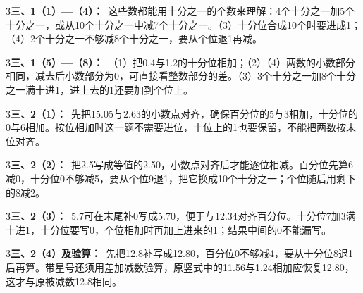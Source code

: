 \documentclass[multi=snippet,border={5bp 20bp 5bp 5bp}]{standalone}
\newenvironment{snippet}[3]{\begin{minipage}{#1bp}\color{answerred}\fontsize{#2}{#3}\selectfont\raggedright}{\end{minipage}}
\begin{document}
\begin{snippet}{505}{11.5}{14}\begin{multicols}{3}\raggedcolumns \textbf{三、1（1）—（4）：}\ 这些数都能用十分之一的个数来理解：4个十分之一加5个十分之一，或从10个十分之一中减7个十分之一。（3）十分位合成10个时要进成1；（4）2个十分之一不够减8个十分之一，要从个位退1再减。\end{multicols}\end{snippet}
\begin{snippet}{505}{11.5}{14}\begin{multicols}{3}\raggedcolumns \textbf{三、1（5）—（8）：}\ （1）把0.4与1.2的十分位相加；（2）（4）两数的小数部分相同，减去后小数部分为0，可直接看整数部分的差。（3）3个十分之一加8个十分之一满十进1，进上去的1还要加到个位上。\end{multicols}\end{snippet}
\begin{snippet}{505}{11.5}{14}\begin{multicols}{3}\raggedcolumns \textbf{三、2（1）：}\ 先把15.05与2.63的小数点对齐，确保百分位的5与3相加，十分位的0与6相加。按位相加时这一题不需要进位，十位上的1也要保留，不能把两数按末位对齐。\end{multicols}\end{snippet}
\begin{snippet}{505}{11.5}{14}\begin{multicols}{3}\raggedcolumns \textbf{三、2（2）：}\ 把2.5写成等值的2.50，小数点对齐后才能逐位相减。百分位先算6减0，十分位0不够减5，要从个位9退1，把它换成10个十分之一；个位随后用剩下的8减2。\end{multicols}\end{snippet}
\begin{snippet}{505}{11.5}{14}\begin{multicols}{3}\raggedcolumns \textbf{三、2（3）：}\ 5.7可在末尾补0写成5.70，便于与12.34对齐百分位。十分位7加3满十进1，十分位要写0，个位相加时再加上进来的1；结果中间的0不能漏写。\end{multicols}\end{snippet}
\begin{snippet}{505}{11.5}{14}\begin{multicols}{3}\raggedcolumns \textbf{三、2（4）及验算：}\ 先把12.8补写成12.80，百分位0不够减4，要从十分位8退1后再算。带星号还须用差加减数验算，原竖式中的11.56与1.24相加应恢复12.80，这才与原被减数12.8相同。\end{multicols}\end{snippet}
\end{document}
